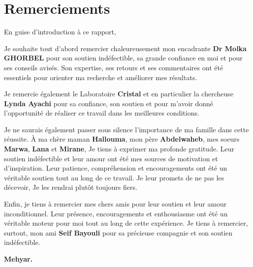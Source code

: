 \chapter*{Remerciements}
\thispagestyle{empty}

En guise d'introduction à ce rapport, \newline

Je souhaite tout d'abord remercier chaleureusement mon encadrante \textbf{Dr Molka GHORBEL} pour son soutien indéfectible, sa grande confiance en moi et pour ses conseils avisés. Son expertise, ses retours et ses commentaires ont été essentiels pour orienter ma recherche et améliorer mes résultats. 

Je remercie également le Laboratoire \textbf{Cristal} et en particulier la chercheuse \textbf{Lynda Ayachi} pour sa confiance, son soutien et pour m'avoir donné l'opportunité de réaliser ce travail dans les meilleures conditions.

Je ne saurais également passer sous silence l'importance de ma famille dans cette réussite. À ma chère maman \textbf{Hallouma}, mon père \textbf{Abdelwaheb}, mes soeurs \textbf{Marwa}, \textbf{Lana} et \textbf{Mirane}, Je tiens à exprimer ma profonde gratitude. Leur soutien indéfectible et leur amour ont été mes sources de motivation et d'inspiration. Leur patience, compréhension et encouragements ont été un véritable soutien tout au long de ce travail. Je leur promets de ne pas les décevoir, Je les rendrai plutôt toujours fiers.


Enfin, je tiens à remercier mes chers amis pour leur soutien et leur amour inconditionnel. Leur présence, encouragements et enthousiasme ont été un véritable moteur pour moi tout au long de cette expérience. Je tiens à remercier, surtout, mon ami \textbf{Seif Bayouli} pour sa précieuse compagnie et son soutien indéfectible.


\begin{flushright}\textbf{Mehyar.} \end{flushright}

\newpage
\thispagestyle{empty}
\null\newpage






